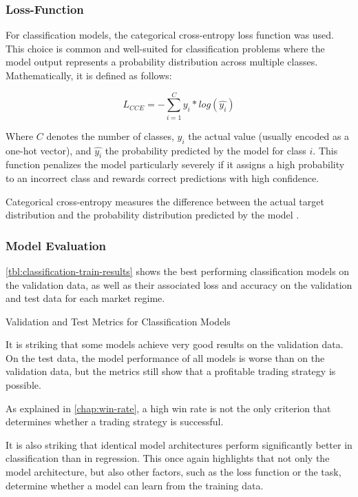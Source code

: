\subsubsection{Loss-Function}

For classification models, the categorical cross-entropy loss function was used.
This choice is common and well-suited for classification problems where the model output represents a probability distribution across multiple classes.
Mathematically, it is defined as follows:

\[
    L_{CCE} = -\sum_{i=1}^{C} y_i*log(\hat{y_i})
\]

\noindent
Where $C$ denotes the number of classes, $y_i$ the actual value (usually encoded as a one-hot vector), and $\hat{y_i}$ the probability predicted by the model for class $i$.
This function penalizes the model particularly severely if it assigns a high probability to an incorrect class and rewards correct predictions with high confidence.

Categorical cross-entropy measures the difference between the actual target distribution and the probability distribution predicted by the model \cite{springer-ml-basics}.

\subsubsection{Model Evaluation}

\autoref{tbl:classification-train-results} shows the best performing classification models on the validation data, as well as their associated loss and accuracy on the validation and test data for each market regime.

\begin{table}[H]
    \centering
    
    \caption{Validation and Test Metrics for Classification Models}
    \label{tbl:classification-train-results}
\end{table}

\noindent
It is striking that some models achieve very good results on the validation data.
On the test data, the model performance of all models is worse than on the validation data, but the metrics still show that a profitable trading strategy is possible.

As explained in \autoref{chap:win-rate}, a high win rate is not the only criterion that determines whether a trading strategy is successful.

It is also striking that identical model architectures perform significantly better in classification than in regression.
This once again highlights that not only the model architecture, but also other factors, such as the loss function or the task, determine whether a model can learn from the training data.